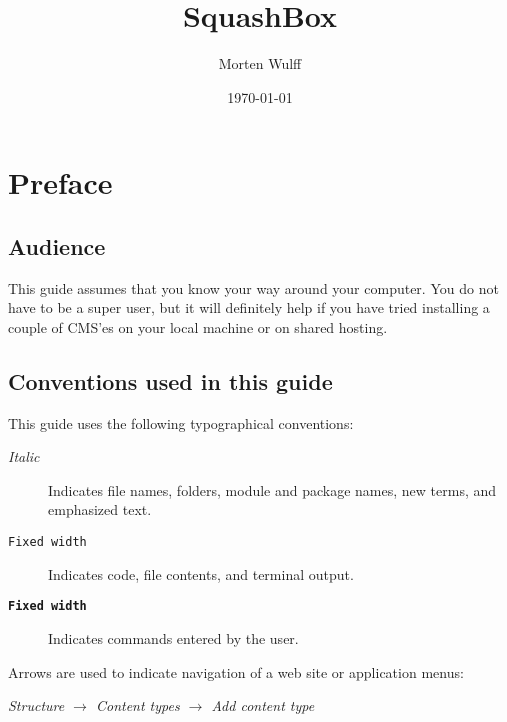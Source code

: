 \documentclass[ebook,10pt,twoside,openright]{memoir}
\title{SquashBox}
\author{Morten Wulff}
\date{\today}
\begin{document}
\frontmatter

\squashboxhalftitlepage{\thetitle}



\begingroup
{}
\tableofcontents*
\endgroup

\chapter{Preface}

\section*{Audience}

This guide assumes that you know your way around your computer. You do not have to be a super user, but it will definitely help if you have tried installing a couple of CMS'es on your local machine or on shared hosting.


\section*{Conventions used in this guide}

\begingroup
\setlength{\parindent}{0pt}

This guide uses the following typographical conventions:

\begin{description}
\item[\normalfont\emph{Italic}] Indicates file names, folders, module and package names, new terms, and emphasized text.
\item[\normalfont\texttt{Fixed width}] Indicates code, file contents, and terminal output.
\item[\normalfont\textbf{\texttt{Fixed width}}] Indicates commands entered by the user.
\end{description}

Arrows are used to indicate navigation of a web site or application menus:

\vspace{0.5\baselineskip}
\hspace{2\baselineskip}\emph{Structure $\rightarrow$ Content types $\rightarrow$ Add content type}
\vspace{0.5\baselineskip}
\end{document}
